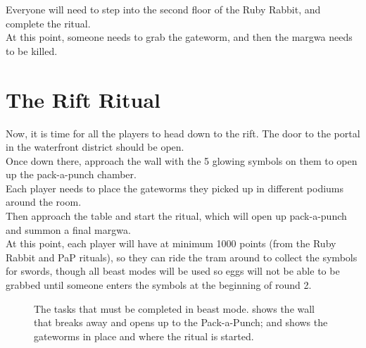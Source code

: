 \documentclass[11pt]{article} %
\begin{document}
	Everyone will need to step into the second floor of the Ruby Rabbit, and complete the ritual. \\

	At this point, someone needs to grab the gateworm, and then the margwa needs to be killed.

\newpage
\section{The Rift Ritual}

	Now, it is time for all the players to head down to the rift. The door to the portal in the waterfront district should be open. \\

	Once down there, approach the wall with the 5 glowing symbols on them to open up the pack-a-punch chamber. \\

	Each player needs to place the gateworms they picked up in different podiums around the room. \\

	Then approach the table and start the ritual, which will open up pack-a-punch and summon a final margwa. \\

	At this point, each player will have at minimum 1000 points (from the Ruby Rabbit and PaP rituals), so they can ride the tram around to collect the symbols for swords, though all beast modes will be used so eggs will not be able to be grabbed until someone enters the symbols at the beginning of round 2.

		\begin{figure}[h!]
		\centering
		\caption{
			The tasks that must be completed in beast mode.
			 shows the wall that breaks away and opens up to the Pack-a-Punch;
			and  shows the gateworms in place and where the ritual is started.
			}
		\label{fig:pap}
	\end{figure}
\end{document}
